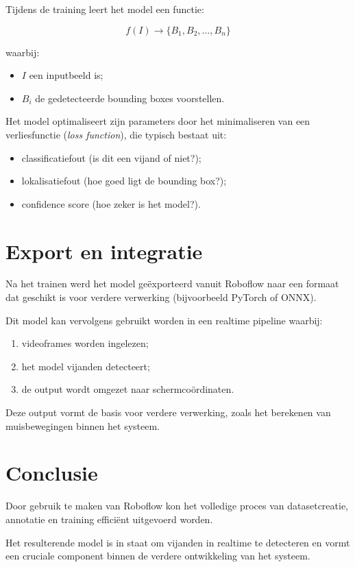 Tijdens de training leert het model een functie:

\[
f(I) \rightarrow \{B_1, B_2, ..., B_n\}
\]

waarbij:
\begin{itemize}
    \item \(I\) een inputbeeld is;
    \item \(B_i\) de gedetecteerde bounding boxes voorstellen.
\end{itemize}

Het model optimaliseert zijn parameters door het minimaliseren van een verliesfunctie (\textit{loss function}), die typisch bestaat uit:
\begin{itemize}
    \item classificatiefout (is dit een vijand of niet?);
    \item lokalisatiefout (hoe goed ligt de bounding box?);
    \item confidence score (hoe zeker is het model?).
\end{itemize}

\section{Export en integratie}

Na het trainen werd het model geëxporteerd vanuit Roboflow naar een formaat dat geschikt is voor verdere verwerking (bijvoorbeeld PyTorch of ONNX).

Dit model kan vervolgens gebruikt worden in een realtime pipeline waarbij:
\begin{enumerate}
    \item videoframes worden ingelezen;
    \item het model vijanden detecteert;
    \item de output wordt omgezet naar schermcoördinaten.
\end{enumerate}

Deze output vormt de basis voor verdere verwerking, zoals het berekenen van muisbewegingen binnen het systeem.

\section{Conclusie}

Door gebruik te maken van Roboflow kon het volledige proces van datasetcreatie, annotatie en training efficiënt uitgevoerd worden.

Het resulterende model is in staat om vijanden in realtime te detecteren en vormt een cruciale component binnen de verdere ontwikkeling van het systeem.